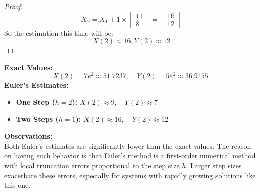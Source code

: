 \documentclass{article}
\begin{document}
\begin{proof}
    \[ X_2 = X_1 + 1 \times \begin{bmatrix} 11 \\ 8 \end{bmatrix} = \begin{bmatrix} 16 \\ 12 \end{bmatrix} \]
    So the estimation this time will be:
    \[ X(2) \approx 16, Y(2) \approx 12 \]
\end{proof}

\noindent \textbf{Exact Values:}
\[
    X(2) = 7e^2 \approx 51.7237, \quad Y(2) = 5e^2 \approx 36.9455.
\]
\textbf{Euler's Estimates:}
\begin{itemize}
    \item \textbf{One Step (\( h = 2 \)):} \( X(2) \approx 9, \quad Y(2) \approx 7 \)
    \item \textbf{Two Steps (\( h = 1 \)):} \( X(2) \approx 16, \quad Y(2) \approx 12 \)
\end{itemize}

\noindent \textbf{Observations:}
\\
Both Euler's estimates are significantly lower than the exact values. The reason on having such behavior is that
Euler's method is a first-order numerical method with local truncation errors proportional to the step size \( h \). 
Larger step sizes exacerbate these errors, especially for systems with rapidly growing solutions like this one.
\end{document}
